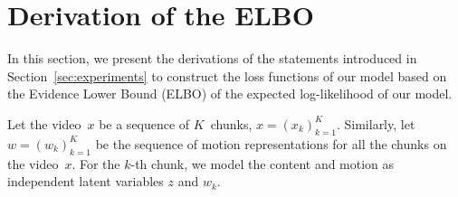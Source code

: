 \renewcommand{\algorithmiccomment}[1]{\hfill$\triangleright$\,#1}

\ifdef{\boximg}{%
\renewcommand{\boximg}[3]{\parbox[c]{#1\subfigsz}{\texttt{[image: \#3]}}}%
}{%
\newcommand{\boximg}[3]{\parbox[c]{#1\subfigsz}{\texttt{[image: \#3]}}}%
}

\appendices
{}

\section{Derivation of the ELBO}
\label{sec:elbo}

In this section, we present the derivations of the statements introduced in Section~\ref{sec:experiments} to construct the loss functions of our model based on the Evidence Lower Bound (ELBO) of the expected log-likelihood of our model.

Let  the video~$x$ be a sequence of $K$~chunks, $x = (x_k)_{k=1}^K$.
Similarly, let $w = \left(w_k\right)_{k=1}^K$ be the sequence of motion representations for all the chunks on the video~$x$. 
For the $k$-th chunk, we model the content and motion as independent latent variables $z$ and $w_k$.


